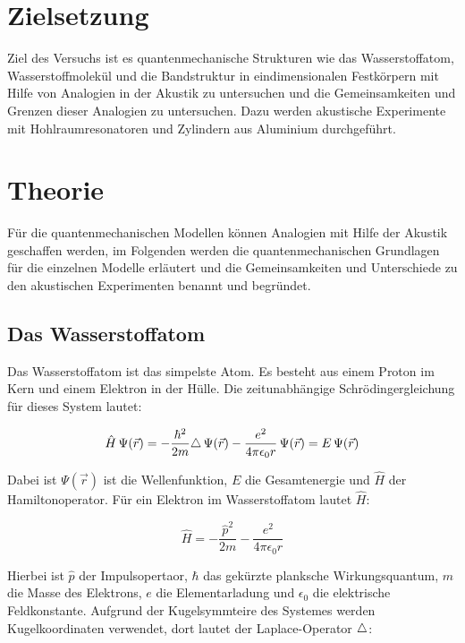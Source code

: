 \section{Zielsetzung}
\label{sec:ziel}

Ziel des Versuchs ist es quantenmechanische Strukturen wie das Wasserstoffatom, Wasserstoffmolekül und die Bandstruktur in eindimensionalen Festkörpern mit Hilfe von Analogien in der Akustik zu untersuchen und die Gemeinsamkeiten und Grenzen dieser Analogien zu untersuchen. Dazu werden akustische Experimente mit Hohlraumresonatoren und Zylindern aus Aluminium durchgeführt.

\section{Theorie}
\label{sec:theorie}

Für die quantenmechanischen Modellen können Analogien mit Hilfe der Akustik geschaffen werden, im Folgenden werden die quantenmechanischen Grundlagen für die einzelnen Modelle erläutert und die Gemeinsamkeiten und Unterschiede zu den akustischen Experimenten benannt und begründet. 

\subsection{Das Wasserstoffatom}
\label{sec:H}

Das Wasserstoffatom ist das simpelste Atom. Es besteht aus einem Proton im Kern und einem Elektron in der Hülle. Die zeitunabhängige Schrödingergleichung für dieses System lautet:

\begin{equation}
    \hat{H} \, \Psi \! \left( \vec{r} \right) = - \frac{\hbar^2}{2 m} \! \mathop{}\!\mathbin\bigtriangleup \, \Psi \! \left( \vec{r} \right)- \frac{e^2}{4 \pi \epsilon_0 r} \, \Psi \! \left( \vec{r} \right) = E \, \Psi \! \left( \vec{r} \right)
    \label{eqn:schroedinger}
\end{equation}

Dabei ist $\Psi \! \left( \vec{r} \right)$ ist die Wellenfunktion, $E$ die Gesamtenergie und $\hat{H}$ der Hamiltonoperator. Für ein Elektron im Wasserstoffatom lautet $\hat{H}$:

\begin{equation}
    \hat{H} = - \frac{\hat{p}^2}{2 m} - \frac{e^2}{4 \pi \epsilon_0 r}
    \label{eqn:H_H}
\end{equation}

Hierbei ist $\hat{p}$ der Impulsopertaor, $\hbar$ das gekürzte planksche Wirkungsquantum, $m$ die Masse des Elektrons, $e$ die Elementarladung und $\epsilon_0$ die elektrische Feldkonstante. Aufgrund der Kugelsymmteire des Systemes werden Kugelkoordinaten verwendet, dort lautet der Laplace-Operator $\mathop{}\!\mathbin\bigtriangleup$:

